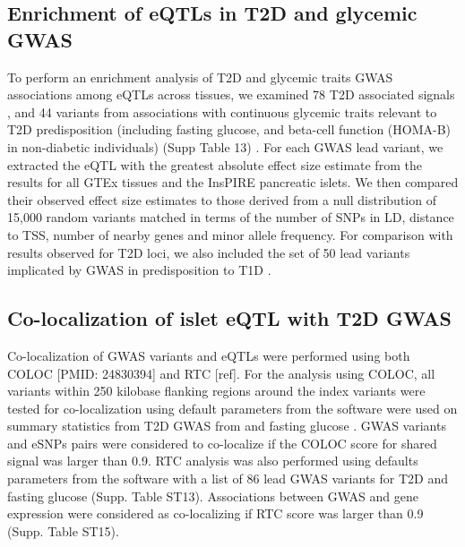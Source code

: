 \subsection{Enrichment of eQTLs in T2D and glycemic GWAS}
To perform an enrichment analysis of T2D and glycemic traits GWAS associations among eQTLs across tissues, we examined 78 T2D associated signals \cite{fuchsbergerGeneticArchitectureType2016a}, and 44 variants from associations with continuous glycemic traits relevant to T2D predisposition (including fasting glucose, and beta-cell function (HOMA-B) in non-diabetic individuals) (Supp Table 13) \cite{scottLargescaleAssociationAnalyses2012, strawbridgeGenomeWideAssociationIdentifies2011, manningfoxHumanIsletFunction2015}. For each GWAS lead variant, we extracted the eQTL with the greatest absolute effect size estimate from the results for all GTEx tissues and the InsPIRE pancreatic islets. We then compared their observed effect size estimates to those derived from a null distribution of 15,000 random variants matched in terms of the number of SNPs in LD, distance to TSS, number of nearby genes and minor allele frequency. For comparison with results observed for T2D loci, we also included the set of 50 lead variants implicated by GWAS in predisposition to T1D \cite{onengut-gumuscuFineMappingType2015}.

\subsection{Co-localization of islet eQTL with T2D GWAS}
Co-localization of GWAS variants and eQTLs were performed using both COLOC [PMID: 24830394] and RTC [ref]. For the analysis using COLOC, all variants within 250 kilobase flanking regions around the index variants were tested for co-localization using default parameters from the software were used on summary statistics from T2D GWAS from \cite{scottExpandedGenomeWideAssociation2017} and fasting glucose \cite{manningGenomewideApproachAccounting2012}. GWAS variants and eSNPs pairs were considered to co-localize if the COLOC score for shared signal was larger than 0.9. RTC analysis was also performed using defaults parameters from the software with a list of 86 lead GWAS variants for T2D and fasting glucose (Supp. Table ST13). Associations between GWAS and gene expression were considered as co-localizing if RTC score was larger than 0.9 (Supp. Table ST15). 

